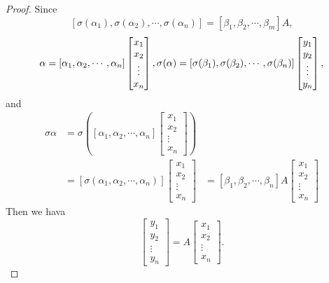 \documentclass{article}
\theoremstyle{definition}
\begin{document}
\begin{proof}
    Since 
    $$
    [\sigma(\alpha_{1}),\sigma(\alpha_{2}),\cdots,\sigma(\alpha_{n})]
=[\beta_{1},\beta_{2},\cdots,\beta_{m}]A,
    $$
    $$
    \alpha = [\alpha_{1},\alpha_{2},\cdots,\alpha_{n}]
    \begin{bmatrix}
        x_{1}\\
        x_{2}\\
        \vdots\\
        x_{n}
    \end{bmatrix}
    ,\\
    \sigma(\alpha) = [\sigma(\beta_{1}),\sigma(\beta_{2}),\cdots,\sigma(\beta_{n})]
    \begin{bmatrix}
        y_{1}\\
        y_{2}\\
        \vdots\\
        y_{n}
    \end{bmatrix},
    $$
    and 
    \begin{align*}
        \sigma{\alpha} 
        & =
        \sigma(
            [\alpha_{1},\alpha_{2},\cdots,\alpha_{n}]
            \begin{bmatrix}
                x_{1}\\
                x_{2}\\
                \vdots\\
                x_{n}
            \end{bmatrix}
        )\\
        & =
        [\sigma(\alpha_{1},\alpha_{2},\cdots,\alpha_{n})]
        \begin{bmatrix}
            x_{1}\\
            x_{2}\\
            \vdots\\
            x_{n}
        \end{bmatrix}
        & =
        [\beta_{1},\beta_{2},\cdots,\beta_{n}]A
        \begin{bmatrix}
            x_{1}\\
            x_{2}\\
            \vdots\\
            x_{n}
        \end{bmatrix}
    \end{align*}
    Then we hava
    $$
    \begin{bmatrix}
        y_{1}\\
        y_{2}\\
        \vdots\\
        y_{n}
    \end{bmatrix}
    =
    A
    \begin{bmatrix}
        x_{1}\\
        x_{2}\\
        \vdots\\
        x_{n}
    \end{bmatrix}
    .$$
\end{proof}
\end{document}

